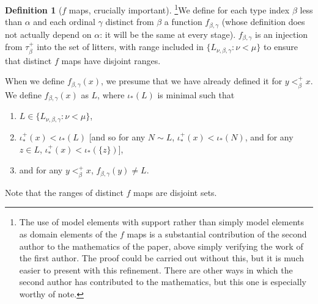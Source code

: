 \documentclass[112pt]{article}
\theoremstyle{definition}
\newtheorem{definition}[theorem]{Definition}
\theoremstyle{remark}
\begin{document}
\begin{definition}[$f$ maps, crucially important]\footnote{The use of model elements with support rather than simply model elements as domain elements of the $f$ maps is a substantial contribution of the second author to the mathematics of the paper, above simply verifying the work of the first author.  The proof could be carried out without this, but it is much easier to present with this refinement.  There are other ways in which the second author has contributed to the mathematics, but this one is especially worthy of note.}\label{def:f_map}
We define for each type index $\beta$ less than $\alpha$ and each ordinal $\gamma$ distinct from $\beta$ a function $f_{\beta,\gamma}$ (whose definition does not actually depend on $\alpha$:  it will be the same at every stage).  $f_{\beta,\gamma}$ is an injection from $\tau_\beta^+$ into the set of litters, with range included in  $\{L_{\nu,\beta,\gamma}:\nu < \mu\}$ to ensure that distinct $f$ maps have disjoint ranges.

\begin{comment} was annot
  Fixed from `for each type index $\beta$ and each ordinal $\gamma$ less than $\alpha$ and distinct from $\beta$'.

Holmes:  it is interesting that this definition works for all $\delta$:  $\delta<\alpha$ is not needed.
\end{comment}


When we define $f_{\beta,\gamma}(x)$, we presume that we have already defined it for $y <^+_\beta x$.
We define $f_{\beta,\gamma}(x)$ as $L$, where $\iota_*(L)$ is minimal such that

\begin{enumerate}
\item $L \in  \{L_{\nu,\beta,\gamma}:\nu < \mu\}$,

\item  $\iota^+_*(x) <\iota_*(L)$ [and so for any $N \sim L$, $\iota^+_*(x) <\iota_*(N)$, and for any $z \in L$, $\iota^+_*(x) < \iota_*(\{z\})$],

\item and for any $y<_\beta^+ x$, $f_{\beta,\gamma}(y) \neq L$.

\end{enumerate}

\end{definition}

Note that the ranges of distinct $f$ maps are disjoint sets.
\end{document}
